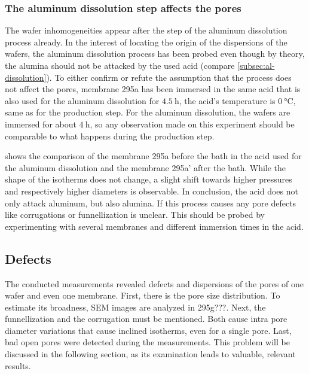 \documentclass[../thesis.tex]{subfiles}
\begin{document}
        \subsubsection{The aluminum dissolution step affects the pores}
        \label{sssec:al-diss-bath}

          The wafer inhomogeneities appear after the step of the aluminum dissolution process already. In the interest of locating the origin of the dispersions of the wafers, the aluminum dissolution process has been probed even though by theory, the alumina should not be attacked by the used acid (compare \cref{subsec:al-dissolution}). To either confirm or refute the assumption that the process does not affect the pores, membrane 295a has been immersed in the same acid that is also used for the aluminum dissolution for $\SI{4,5}{\hour}$, the acid's temperature is $\SI{0}{\celsius}$, same as for the production step. For the aluminum dissolution, the wafers are immersed for about $\SI{4}{\hour}$, so any observation made on this experiment should be comparable to what happens during the production step.
          \medskip

           shows the comparison of the membrane 295a before the bath in the acid used for the aluminum dissolution and the membrane 295a' after the bath. While the shape of the isotherms does not change, a slight shift towards higher pressures and respectively higher diameters is observable. In conclusion, the acid does not only attack aluminum, but also alumina. If this process causes any pore defects like corrugations or funnellization is unclear. This should be probed by experimenting with several membranes and different immersion times in the acid.

          


    \subsection{Defects}
    \label{subsec:defects}

        The conducted measurements revealed defects and dispersions of the pores of one wafer and even one membrane. First, there is the pore size distribution. To estimate its broadness, SEM images are analyzed in 295g???. Next, the funnellization and the corrugation must be mentioned. Both cause intra pore diameter variations that cause inclined isotherms, even for a single pore. Last, bad open pores were detected during the measurements. This problem will be discussed in the following section, as its examination leads to valuable, relevant results.
\end{document}
